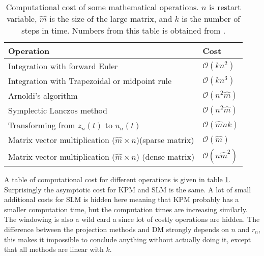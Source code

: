 \begin{table}
\begin{tabular}{l l }
Operation & Cost \\
\hline
Integration with forward Euler & $\mathcal{O}(k n^2)$ \\
Integration with Trapezoidal or midpoint rule & $\mathcal{O}(k n^3)$ \\
Arnoldi's algorithm & $ \mathcal{ O }(n^2 \hat{m})$ \\
Symplectic Lanczos method & $ \mathcal{O}(n^2 \hat{m}) $\\
Transforming from $z_n(t)$ to $u_n(t)$ & $ \mathcal{O}(\hat{m}nk) $\\
Matrix vector multiplication ($\hat{m}\times n$)(sparse matrix) & $ \mathcal{O}(\hat{m}) $ \\
Matrix vector multiplication ($\hat{m}\times n$) (dense matrix) & $ \mathcal{O}(n \hat{m}^2) $
\end{tabular}

\caption{Computational cost of some mathematical operations. $n$ is restart variable, $\hat{m}$ is the size of the large matrix, and $k$ is the number of steps in time. Numbers from this table is obtained from \cite{complex}. }
\label{tab:cd}
\end{table}

A table of computational cost for different operations is given in table \ref{tab:cd}. \\
Surprisingly the asymptotic cost for KPM and SLM is the same. A lot of small additional costs for SLM is hidden here meaning that KPM probably has a smaller computation time, but the computation times are increasing similarly. The windowing is also a wild card a since lot of costly operations are hidden. The difference between the projection methods and DM strongly depends on $n$ and $r_n$, this makes it impossible to conclude anything without actually doing it, except that all methods are linear with $k$. \\


